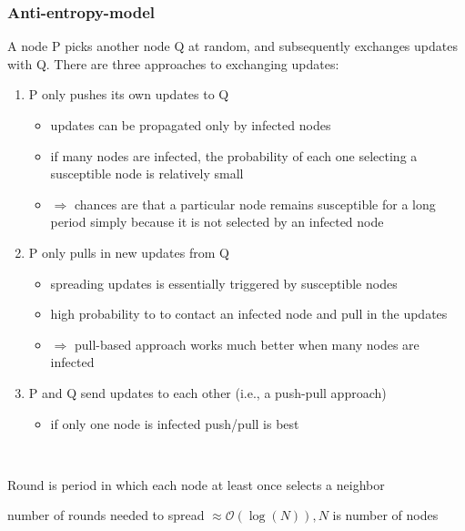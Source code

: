 \documentclass[ngerman,a4paper]{report}
\begin{document}
\subsubsection*{Anti-entropy-model}

A node P picks another node Q at random, and subsequently exchanges updates with Q.
There are three approaches to exchanging updates:
\begin{enumerate}

	\item P only pushes its own updates to Q
	\begin{itemize}
		\item updates can be propagated only by infected nodes
		\item if many nodes are infected, the probability of each one selecting a susceptible node is relatively small
		\item $\Rightarrow$ chances are that a particular node remains susceptible for a long period simply because it is not selected by an infected node
	\end{itemize}

	\item P only pulls in new updates from Q
	\begin{itemize}		
		\item spreading updates is essentially triggered by susceptible nodes
		\item high probability to to contact an infected node and pull in the updates
		\item $\Rightarrow$ pull-based approach works much better when many nodes are infected
	\end{itemize}

	\item P and Q send updates to each other (i.e., a push-pull approach)
	\begin{itemize}
		\item if only one node is infected push/pull is best
	\end{itemize}
\end{enumerate}

\

\begin{compactitem}
	\item Round is period in which each node at least once selects a neighbor
	\item number of rounds needed to spread  $\approx \mathcal{O}(\log(N)), N$ is number of nodes
\end{compactitem}
\end{document}
